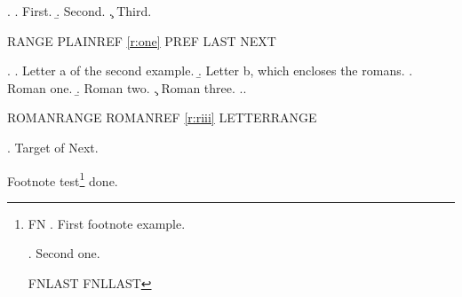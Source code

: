 

\ex.\label{r:one}
\a. First.
\b. Second.
\c. Third.

RANGE  PLAINREF \ref{r:one} PREF 
LAST \Last{} NEXT \Next{}

\ex.\label{r:two}
\a. Letter a of the second example.
\b. Letter b, which encloses the romans.
\a. Roman one.
\b. Roman two.
\c. Roman three.
\z.\z.

ROMANRANGE  ROMANREF \ref{r:riii}
LETTERRANGE 

\ex. Target of Next.

Footnote test\footnote{FN
\ex. First footnote example.

\ex. Second one.

FNLAST \Last{} FNLLAST \LLast{}} done.

